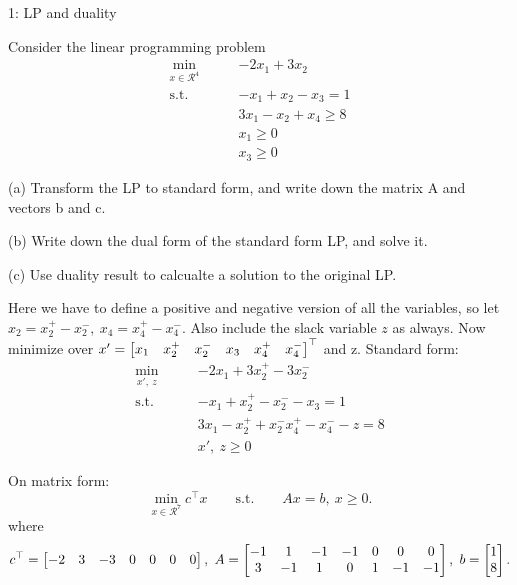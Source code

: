 
\begin{problem}{1: LP and duality}

Consider the linear programming problem
\begin{align*}
  \min_{x\in\mathcal{R}^{4}} \qquad & -2x_1 + 3x_2        \\
  \text{s.t.}\qquad                 &
  -x_1+x_2-x_3 = 1                                        \\
                                    & 3x_1-x_2+x_4 \geq 8 \\
                                    & x_1\geq 0           \\
                                    & x_3 \geq 0
\end{align*}

\medskip (a) Transform the LP to standard form, and write down the matrix A and vectors b and c.

\medskip (b) Write down the dual form of the standard form LP, and solve it.

\medskip (c) Use duality result to calcualte a solution to the original LP.

\end{problem}



Here we have to define a positive and negative version of all the variables, so let $x_2 = x_2^{+} - x_2^{-},\  x_4 = x_4^{+}- x_4^{-}$.
Also include the slack variable $z$ as always. Now minimize over $x' = \begin{bmatrix} x_1 & x_2^{+} & x_2^{-} & x_3 & x_4^{+} & x_4^{-} \end{bmatrix}^{\top}$ and z.
Standard form:
\begin{align*}
  \min_{x',\  z} \qquad & -2x_1 + 3x_2^{+}- 3x_2^{-}                \\
  \text{s.t.}\qquad     & -x_1+x_2^{+}-x_2^{-}-x_3 = 1              \\
                        & 3x_1-x_2^{+}+x_2^{-}x_4^{+}-x_4^{-}-z = 8 \\
                        & x',\  z \geq 0
\end{align*}

On matrix form:
\[
  \min_{x\in\mathcal{R}^{7}} c^{\top}x \qquad\text{s.t.}\qquad Ax = b ,\ x \geq 0
  .\]
where
\[
  c^{\top} = \begin{bmatrix} -2 & 3 & -3 & 0 & 0 & 0 & 0 \end{bmatrix} ,\ A = \begin{bmatrix} -1 & 1 & -1 & -1 & 0 & 0 & 0 \\ 3 & -1 & 1 & 0 & 1 & -1 & -1 \end{bmatrix} ,\ b = \begin{bmatrix} 1 \\ 8 \end{bmatrix}
  .\]


